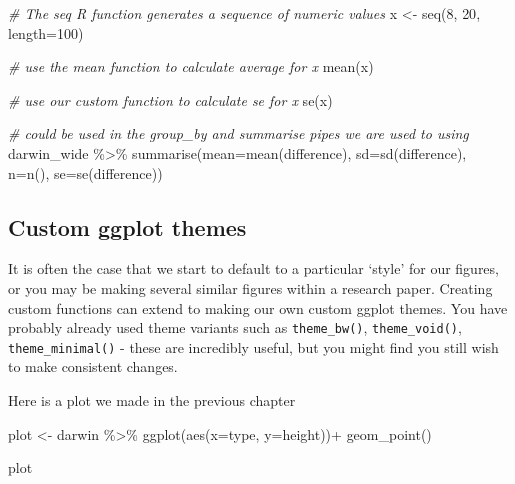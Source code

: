 \documentclass[
]{book}
\newenvironment{Shaded}{\begin{snugshade}}{\end{snugshade}}
\newcommand{\AttributeTok}[1]{\textcolor[rgb]{0.77,0.63,0.00}{#1}}
\newcommand{\CommentTok}[1]{\textcolor[rgb]{0.56,0.35,0.01}{\textit{#1}}}
\newcommand{\DecValTok}[1]{\textcolor[rgb]{0.00,0.00,0.81}{#1}}
\newcommand{\FunctionTok}[1]{\textcolor[rgb]{0.00,0.00,0.00}{#1}}
\newcommand{\NormalTok}[1]{#1}
\newcommand{\OtherTok}[1]{\textcolor[rgb]{0.56,0.35,0.01}{#1}}
\newcommand{\SpecialCharTok}[1]{\textcolor[rgb]{0.00,0.00,0.00}{#1}}
\begin{document}
\begin{Shaded}
\begin{Highlighting}[]
\CommentTok{\# The seq R function generates a sequence of numeric values}
\NormalTok{x }\OtherTok{\textless{}{-}} \FunctionTok{seq}\NormalTok{(}\DecValTok{8}\NormalTok{, }\DecValTok{20}\NormalTok{, }\AttributeTok{length=}\DecValTok{100}\NormalTok{)}

\CommentTok{\# use the mean function to calculate average for x}
\FunctionTok{mean}\NormalTok{(x)}

\CommentTok{\# use our custom function to calculate se for x}
\FunctionTok{se}\NormalTok{(x)}

\CommentTok{\# could be used in the group\_by and summarise pipes we are used to using}
\NormalTok{darwin\_wide }\SpecialCharTok{\%\textgreater{}\%} 
  \FunctionTok{summarise}\NormalTok{(}\AttributeTok{mean=}\FunctionTok{mean}\NormalTok{(difference),}
            \AttributeTok{sd=}\FunctionTok{sd}\NormalTok{(difference),}
            \AttributeTok{n=}\FunctionTok{n}\NormalTok{(),}
            \AttributeTok{se=}\FunctionTok{se}\NormalTok{(difference))}
\end{Highlighting}
\end{Shaded}

\hypertarget{custom-ggplot-themes}{%
\subsection{Custom ggplot themes}\label{custom-ggplot-themes}}

It is often the case that we start to default to a particular `style' for our figures, or you may be making several similar figures within a research paper. Creating custom functions can extend to making our own custom ggplot themes. You have probably already used theme variants such as \texttt{theme\_bw()}, \texttt{theme\_void()}, \texttt{theme\_minimal()} - these are incredibly useful, but you might find you still wish to make consistent changes.

Here is a plot we made in the previous chapter

\begin{Shaded}
\begin{Highlighting}[]
\NormalTok{plot }\OtherTok{\textless{}{-}}\NormalTok{ darwin }\SpecialCharTok{\%\textgreater{}\%} 
  \FunctionTok{ggplot}\NormalTok{(}\FunctionTok{aes}\NormalTok{(}\AttributeTok{x=}\NormalTok{type,}
         \AttributeTok{y=}\NormalTok{height))}\SpecialCharTok{+}
  \FunctionTok{geom\_point}\NormalTok{()}

\NormalTok{plot}
\end{Highlighting}
\end{Shaded}
\end{document}
